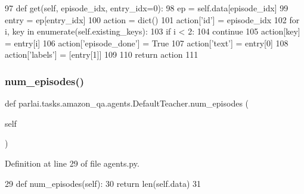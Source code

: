 \begin{DoxyCode}
97     \textcolor{keyword}{def }get(self, episode\_idx, entry\_idx=0):
98         ep = self.data[episode\_idx]
99         entry = ep[entry\_idx]
100         action = dict()
101         action[\textcolor{stringliteral}{'id'}] = episode\_idx
102         \textcolor{keywordflow}{for} i, key \textcolor{keywordflow}{in} enumerate(self.existing\_keys):
103             \textcolor{keywordflow}{if} i < 2:
104                 \textcolor{keywordflow}{continue}
105             action[key] = entry[i]
106         action[\textcolor{stringliteral}{'episode\_done'}] = \textcolor{keyword}{True}
107         action[\textcolor{stringliteral}{'text'}] = entry[0]
108         action[\textcolor{stringliteral}{'labels'}] = [entry[1]]
109 
110         \textcolor{keywordflow}{return} action
111 
\end{DoxyCode}
\mbox{\label{classparlai_1_1tasks_1_1amazon__qa_1_1agents_1_1DefaultTeacher_a3a1a2ff47ab734ec74022502502b7f79}} 
\subsubsection{\texorpdfstring{num\+\_\+episodes()}{num\_episodes()}}
{\footnotesize\ttfamily def parlai.\+tasks.\+amazon\+\_\+qa.\+agents.\+Default\+Teacher.\+num\+\_\+episodes (\begin{DoxyParamCaption}\item[{}]{self }\end{DoxyParamCaption})}



Definition at line 29 of file agents.\+py.


\begin{DoxyCode}
29     \textcolor{keyword}{def }num\_episodes(self):
30         \textcolor{keywordflow}{return} len(self.data)
31 
\end{DoxyCode}
\mbox{\label{classparlai_1_1tasks_1_1amazon__qa_1_1agents_1_1DefaultTeacher_a7500d021a66a77b200b43d910afcb6e4}} 

